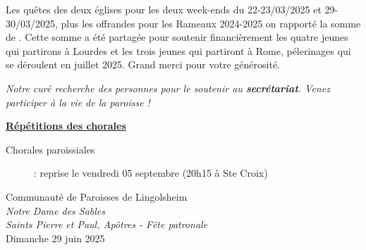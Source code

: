 \documentclass[french,11pt]{article}
\newcommand{\JournalName}[1]{%
		\begin{center}
            \Large \usefont{T1}{augie}{m}{n}
			#1%
		\end{center}
		\par \normalsize \normalfont}
\newcommand*{\footer}{..}
\newcommand{\NewsItem}[1]{%
\vspace{3pt}
\underline{\textbf{#1}}
		  }
\begin{document}
\begin{framed}
Les quêtes des deux églises pour les deux week-ends du 22-23/03/2025 et 29-30/03/2025, plus les offrandes pour les Rameaux 2024-2025 on rapporté
la somme de . Cette somme a été partagée pour soutenir financièrement les quatre jeunes qui partirons à Lourdes et les trois jeunes qui partiront à Rome,
pélerinages qui se déroulent en juillet 2025. Grand merci pour votre générosité.
\end{framed}

\emph{Notre curé recherche des personnes pour le soutenir au \textbf{secrétariat}. Venez participer à la vie de la paroisse !}

\NewsItem{Répétitions des chorales}
\begin{description}
\item[Chorales paroissiales] : reprise le vendredi 05 septembre (20h15 à Ste Croix)
\end{description}



\newpage

\JournalName{Communauté de Paroisses de Lingolsheim \\
\normalsize \textit{Notre Dame des Sables}
\\  \normalsize \textit{Saints Pierre et Paul, Apôtres - Fête patronale}
\\ \large Dimanche 29 juin  2025}


\begin{minipage}[h]{1.0\linewidth}
\setlength{\parindent}{1em}

\end{minipage}
\end{document}
